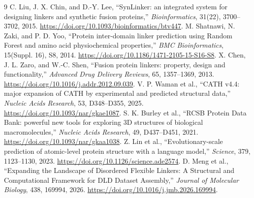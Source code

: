\documentclass[10pt,a4paper]{article}
\begin{document}
\begin{thebibliography}{9}
 C. Liu, J. X. Chin, and D.-Y. Lee, ``SynLinker: an integrated system for designing linkers and synthetic fusion proteins,'' \emph{Bioinformatics}, 31(22), 3700--3702, 2015. \url{https://doi.org/10.1093/bioinformatics/btv447}.
 M. Shatnawi, N. Zaki, and P. D. Yoo, ``Protein inter-domain linker prediction using Random Forest and amino acid physiochemical properties,'' \emph{BMC Bioinformatics}, 15(Suppl. 16), S8, 2014. \url{https://doi.org/10.1186/1471-2105-15-S16-S8}.
 X. Chen, J. L. Zaro, and W.-C. Shen, ``Fusion protein linkers: property, design and functionality,'' \emph{Advanced Drug Delivery Reviews}, 65, 1357--1369, 2013. \url{https://doi.org/10.1016/j.addr.2012.09.039}.
 V. P. Waman et al., ``CATH v4.4: major expansion of CATH by experimental and predicted structural data,'' \emph{Nucleic Acids Research}, 53, D348--D355, 2025. \url{https://doi.org/10.1093/nar/gkae1087}.
 S. K. Burley et al., ``RCSB Protein Data Bank: powerful new tools for exploring 3D structures of biological macromolecules,'' \emph{Nucleic Acids Research}, 49, D437--D451, 2021. \url{https://doi.org/10.1093/nar/gkaa1038}.
 Z. Lin et al., ``Evolutionary-scale prediction of atomic-level protein structure with a language model,'' \emph{Science}, 379, 1123--1130, 2023. \url{https://doi.org/10.1126/science.ade2574}.
 D. Meng et al., ``Expanding the Landscape of Disordered Flexible Linkers: A Structural and Computational Framework for DLD Dataset Assembly,'' \emph{Journal of Molecular Biology}, 438, 169994, 2026. \url{https://doi.org/10.1016/j.jmb.2026.169994}.
\end{thebibliography}
\end{document}
